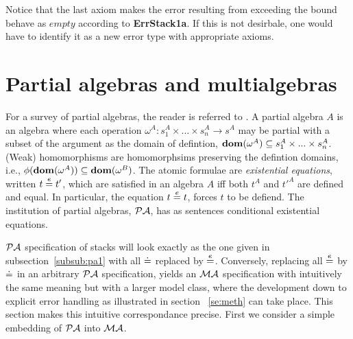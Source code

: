 \documentclass[10pt]{article}
\begin{document}
\noindent
Notice that the last axiom makes the error resulting from exceeding the bound
behave as $empty$ according to {\bf ErrStack1a}. If this is not desirbale,
one would have to identify it as a new error type with appropriate axioms.



\section{Partial algebras and multialgebras}\label{se:partial}
For a survey of partial algebras, the reader is referred to
\cite{burm,state,mossa}. A partial algebra $A$ is an
algebra where each operation $\omega^A:s_1^A\times...\times s_n^A\to s^A$ may
be partial with a subset of the argument as the domain of defintion, 
${\bf dom}(\omega^A)\subseteq s_1^A\times...\times s_n^A$. (Weak) homomorphisms
are homomorphsims preserving the defintion domains, i.e.,
$\phi({\bf dom}(\omega^A))\subseteq {\bf dom}(\omega^B)$. The atomic formulae are {\em
existential equations}, written $t\stackrel{e}{=} t'$, which are satisfied in an
algebra $A$ iff both $t^A$ and $t'^A$ are defined and equal. In particular,
the equation $t\stackrel{e}{=} t$, forces $t$ to be defiend. 
The institution
of partial algebras, ${\mathcal{PA}}$, has as sentences conditional existential
equations. 

${\mathcal{PA}}$ specification of stacks will look exactly as the one given in
subsection~\ref{subsub:pa1} with all $\mathrel{\dot{=} }$ replaced by $\stackrel{e}{=}$.
Conversely, replacing
all $\stackrel{e}{=}$ by $\mathrel{\dot{=} }$ in an
arbitrary ${\mathcal{PA}}$ specification, yields
an ${\mathcal{MA}}$ specification with intuitively the same meaning but
with a larger model class, where the development down to explicit error
handling as illustrated in section ~\ref{se:meth} can take place. This section
makes this intuitive correspondance precise. First we consider a simple
embedding of ${\mathcal{PA}}$ into ${\mathcal{MA}}$.
\end{document}
